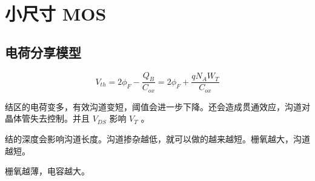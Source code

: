 \documentclass[cn,11pt,chinese,black,simple]{../elegantbook}
\begin{document}
\fi 
\def\chapname{07minimos}

\chapter{小尺寸 MOS} 

\section{电荷分享模型}

\[V_{t h}=2 \phi_{F}-\frac{Q_{B}}{C_{o x}}=2 \phi_{F}+\frac{q N_{A} W_{T}}{C_{o x}}\]

结区的电荷变多，有效沟道变短，阈值会进一步下降。还会造成贯通效应，沟道对晶体管失去控制。并且 \(V_{DS}\) 影响 \(V_T\) 。

结的深度会影响沟道长度。沟道掺杂越低，就可以做的越来越短。栅氧越大，沟道越短。

栅氧越薄，电容越大。



\let\chapname\undefined
\ifx\mainclass\undefined
\end{document}
